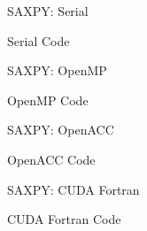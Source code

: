 \documentclass[10pt,t]{beamer}
\begin{document}
\begin{frame}[fragile]{SAXPY: Serial}
  \begin{exampleblock}{Serial Code}
     
  \end{exampleblock}
\end{frame}
\begin{frame}[fragile]{SAXPY: OpenMP}
  \vspace{-0.5cm}
  \begin{exampleblock}{OpenMP Code}
     
  \end{exampleblock}
\end{frame}
\begin{frame}[fragile]{SAXPY: OpenACC}
  \vspace{-0.5cm}
  \begin{exampleblock}{OpenACC Code}
     
  \end{exampleblock}
\end{frame}
\begin{frame}[fragile]{SAXPY: CUDA Fortran}
  \vspace{-0.5cm}
  \begin{exampleblock}{CUDA Fortran Code}
     
  \end{exampleblock}
\end{frame}
\end{document}
